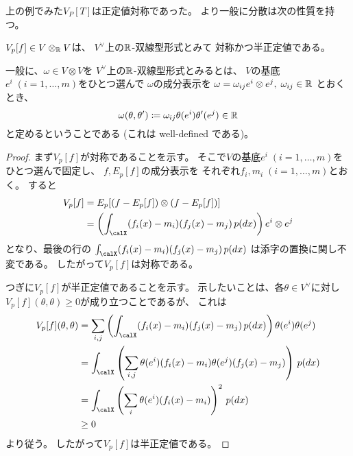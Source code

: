 \documentclass[report]{jlreq}
\begin{document}
上の例でみた$V_P[T]$は正定値対称であった。
より一般に分散は次の性質を持つ。

\begin{theorem}[分散の半正定値対称性]
    $V_p[f] \in V \otimes_{\mathbb{R}} V$は、
    $V^\vee$上の$\mathbb{R}$-双線型形式とみて
    対称かつ半正定値である。
\end{theorem}

\begin{remark}[双線型形式としてのテンソル]
    一般に、$\omega \in V \otimes V$を
    $V^\vee$上の$\mathbb{R}$-双線型形式とみるとは、
    $V$の基底$e^i \; (i = 1, \dots, m)$をひとつ選んで
    $\omega$の成分表示を
    $\omega = \omega_{ij} e^i \otimes e^j, \;
        \omega_{ij} \in \mathbb{R}$
    とおくとき、
    \begin{equation}
        \omega(\theta, \theta')
            \coloneqq \omega_{ij} \theta(e^i) \theta'(e^j)
            \in \mathbb{R}
    \end{equation}
    と定めるということである (これは well-defined である)。
\end{remark}

\begin{proof}
    まず$V_p[f]$が対称であることを示す。
    そこで$V$の基底$e^i \; (i = 1, \dots, m)$をひとつ選んで固定し、
    $f, E_p[f]$の成分表示を
    それぞれ$f_i, m_i \; (i = 1, \dots, m)$とおく。
    すると
    \begin{alignat}{1}
        V_p[f]
            &= E_p[(f - E_p[f]) \otimes (f - E_p[f])] \\
            &= \myparen{
                \int_\calX
                (f_i(x) - m_i)(f_j(x) - m_j)
                \, p(dx)
            } e^i \otimes e^j
    \end{alignat}
    となり、最後の行の
    $\int_\calX (f_i(x) - m_i)(f_j(x) - m_j) \, p(dx)$
    は添字の置換に関し不変である。
    したがって$V_p[f]$は対称である。

    つぎに$V_p[f]$が半正定値であることを示す。
    示したいことは、各$\theta \in V^\vee$に対し
    $V_p[f](\theta, \theta) \ge 0$が成り立つことであるが、
    これは
    \begin{alignat}{1}
        V_p[f](\theta, \theta)
            &= \sum_{i, j}
                \myparen{
                    \int_\calX (f_i(x) - m_i)(f_j(x) - m_j) \, p(dx)
                }
                \theta(e^i) \theta(e^j) \\
            &= \int_\calX \myparen{
                \sum_{i, j}
                \theta(e^i)(f_i(x) - m_i)
                \theta(e^j)(f_j(x) - m_j)
            } \, p(dx) \\
            &= \int_\calX \myparen{
                \sum_{i}
                \theta(e^i)(f_i(x) - m_i)
            }^2 \, p(dx) \\
            &\ge 0
    \end{alignat}
    より従う。
    したがって$V_p[f]$は半正定値である。
\end{proof}
\end{document}
